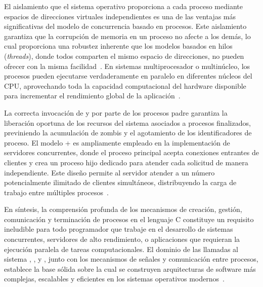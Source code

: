 El aislamiento que el sistema operativo proporciona a cada proceso mediante espacios de direcciones virtuales independientes es una de las ventajas más significativas del modelo de concurrencia basado en procesos. Este aislamiento garantiza que la corrupción de memoria en un proceso no afecte a los demás, lo cual proporciona una robustez inherente que los modelos basados en hilos (\textit{threads}), donde todos comparten el mismo espacio de direcciones, no pueden ofrecer con la misma facilidad~\cite{silberschatz2018}. En sistemas multiprocesador o multinúcleo, los procesos pueden ejecutarse verdaderamente en paralelo en diferentes núcleos del CPU, aprovechando toda la capacidad computacional del hardware disponible para incrementar el rendimiento global de la aplicación~\cite{love2013}.

La correcta invocación de  y  por parte de los procesos padre garantiza la liberación oportuna de los recursos del sistema asociados a procesos finalizados, previniendo la acumulación de zombis y el agotamiento de los identificadores de proceso. El modelo  +  es ampliamente empleado en la implementación de servidores concurrentes, donde el proceso principal acepta conexiones entrantes de clientes y crea un proceso hijo dedicado para atender cada solicitud de manera independiente. Este diseño permite al servidor atender a un número potencialmente ilimitado de clientes simultáneos, distribuyendo la carga de trabajo entre múltiples procesos~\cite{stevens2013}.

En síntesis, la comprensión profunda de los mecanismos de creación, gestión, comunicación y terminación de procesos en el lenguaje C constituye un requisito ineludible para todo programador que trabaje en el desarrollo de sistemas concurrentes, servidores de alto rendimiento, o aplicaciones que requieran la ejecución paralela de tareas computacionales. El dominio de las llamadas al sistema , ,  y , junto con los mecanismos de señales y comunicación entre procesos, establece la base sólida sobre la cual se construyen arquitecturas de software más complejas, escalables y eficientes en los sistemas operativos modernos~\cite{silberschatz2018, tanenbaum2015}.